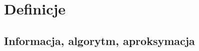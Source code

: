 \documentclass[oik, pdftex, robocza, man]{mgrwms}
\begin{document}
\begin{wstep}[Wprowadzenie]



\end{wstep}


\chapter{Definicje}

\section{Informacja, algorytm, aproksymacja}
\end{document}
